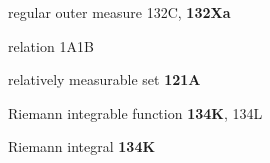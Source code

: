 regular outer measure 132C, {\bf 132Xa}











relation 1A1B
































relatively measurable set {\bf 121A}
















































Riemann integrable function {\bf 134K}, 134L

Riemann integral {\bf 134K}





